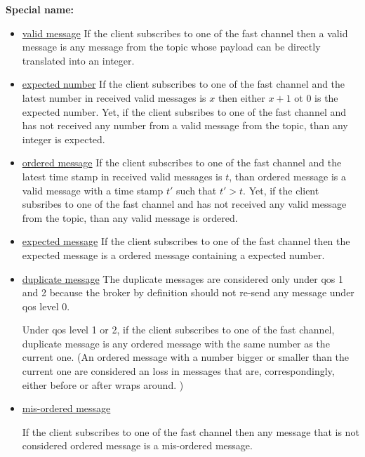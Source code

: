\documentclass[12pt, letterpaper]{article}
\begin{document}
\textbf{Special name:}
\begin{itemize}
	\item \underline{valid message}
	If the client subscribes to one of the fast channel then a valid message is any message from the topic whose payload can be directly translated into an integer.
	
	\item \underline{expected number}
	If the client subscribes to one of the fast channel and the latest number in received valid messages is $x$ then either $x+1$ ot $0$ is the expected number. Yet, if the client subsribes to one of the fast channel and has not received any number from a valid message from the topic, than any integer is expected.
		
	\item \underline{ordered message}
	If the client subscribes to one of the fast channel and the latest time stamp in received valid messages is $t$, than ordered message is a valid message with a time stamp $t'$ such that $t' > t$. Yet, if the client subsribes to one of the fast channel and has not received any valid message from the topic, than any valid message is ordered.
	
	\item \underline{expected message}
	If the client subscribes to one of the fast channel then the expected message is a ordered message containing a expected number.
	
	\item \underline{duplicate message}
	The duplicate messages are considered only under qos 1 and 2 because the broker by definition should not re-send any message under qos level 0. 
	
	Under qos level 1 or 2, if the client subscribes to one of the fast channel, duplicate message is any ordered message with the same number as the current one. (An ordered message with a number bigger or smaller than the current one are considered an loss in messages that are, correspondingly, either before or after wraps around. )
	
	\item \underline{mis-ordered message}
	
	If the client subscribes to one of the fast channel then any message that is not considered ordered message is a mis-ordered message.
	
\end{itemize}
\end{document}
